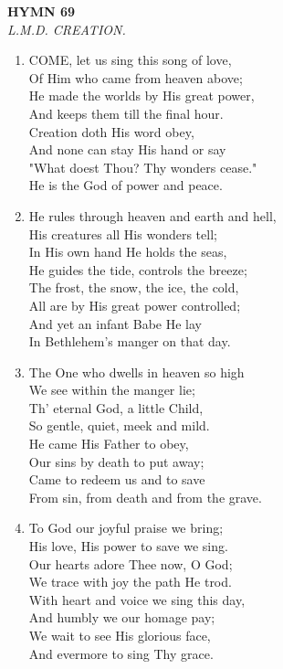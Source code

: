 \newpage
\begin{center}
    {\Large \textbf{HYMN 69}}
    \\
    \textit{L.M.D. CREATION.}
\end{center}
\vspace{1em}

\begin{enumerate}
    \item COME, let us sing this song of love, \\
        Of Him who came from heaven above; \\
        He made the worlds by His great power, \\
        And keeps them till the final hour. \\
        Creation doth His word obey, \\
        And none can stay His hand or say \\
        "What doest Thou? Thy wonders cease." \\
        He is the God of power and peace.

    \item He rules through heaven and earth and hell, \\
        His creatures all His wonders tell; \\
        In His own hand He holds the seas, \\
        He guides the tide, controls the breeze; \\
        The frost, the snow, the ice, the cold, \\
        All are by His great power controlled; \\
        And yet an infant Babe He lay \\
        In Bethlehem's manger on that day.

    \item The One who dwells in heaven so high \\
        We see within the manger lie; \\
        Th' eternal God, a little Child, \\
        So gentle, quiet, meek and mild. \\
        He came His Father to obey, \\
        Our sins by death to put away; \\
        Came to redeem us and to save \\
        From sin, from death and from the grave.

    \item To God our joyful praise we bring; \\
        His love, His power to save we sing. \\
        Our hearts adore Thee now, O God; \\
        We trace with joy the path He trod. \\
        With heart and voice we sing this day, \\
        And humbly we our homage pay; \\
        We wait to see His glorious face, \\
        And evermore to sing Thy grace.

\end{enumerate}

